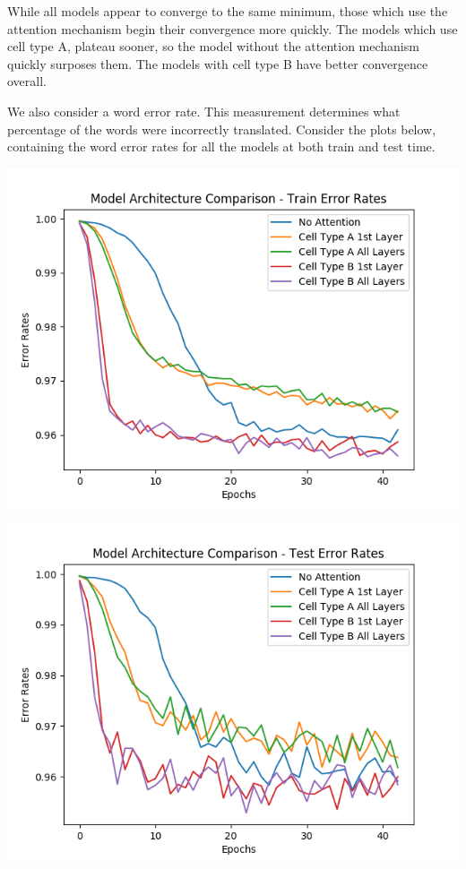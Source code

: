 \documentclass[letterpaper, 10pt]{article}
\begin{document}
\begin{multicols}{2}
\noindent While all models appear to converge to the same minimum, those which use the attention
mechanism begin their convergence more quickly.
The models which use cell type A, plateau sooner, so the model without the attention mechanism
quickly surposes them.
The models with cell type B have better convergence overall.

We also consider a word error rate.
This measurement determines what percentage of the words were incorrectly translated.
Consider the plots below, containing the word error rates for all the models at both train and test
time.

\begin{center}
\includegraphics[scale=.4]{model_comparison_error_rates_train}
\end{center}

\begin{center}
\includegraphics[scale=.4]{model_comparison_error_rates_test}
\end{center}


\end{multicols}
\end{document}
